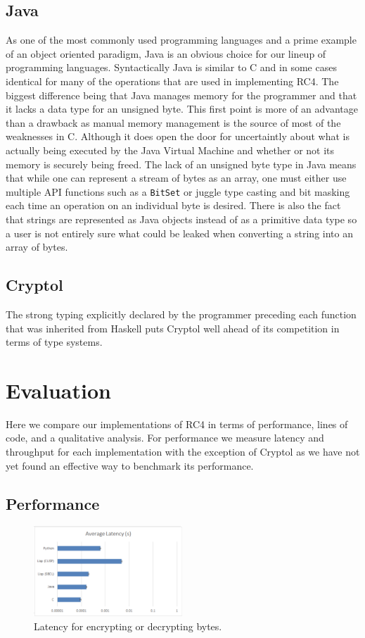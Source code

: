 \subsection{Java}
As one of the most commonly used programming languages and a prime example of an object oriented paradigm, Java is an obvious choice for our lineup of programming languages.
Syntactically Java is similar to C and in some cases identical for many of the operations that are used in implementing RC4. The biggest difference being that Java manages 
memory for the programmer and that it lacks a data type for an unsigned byte. This first point is more of an advantage than a drawback as manual memory management is the 
source of most of the weaknesses in C. Although it does open the door for uncertaintly about what is actually being executed by the Java Virtual Machine and whether or not 
its memory is securely being freed. The lack of an unsigned byte type in Java means that while one can represent a stream of bytes as an array, one must either use multiple 
API functions such as a \texttt{BitSet} or juggle type casting and bit masking each time an operation on an individual byte is desired. There is also the fact that 
strings are represented as Java objects instead of as a primitive data type so a user is not entirely sure what could be leaked when converting a string into an array of 
bytes.

\subsection{Cryptol}
The strong typing explicitly declared by the programmer preceding each function that was inherited from Haskell puts Cryptol well ahead of its competition in terms of 
type systems.

\section{Evaluation}
Here we compare our implementations of RC4 in terms of performance, lines of code, and a qualitative analysis. For performance we measure latency and throughput for 
each implementation with the exception of Cryptol as we have not yet found an effective way to benchmark its performance.

\subsection{Performance}

\begin{figure}
\centerline{ 
\includegraphics[width = 0.5\textwidth]{latency.PNG}}
\caption{Latency for encrypting or decrypting bytes.}
\label{fig:lan}
\end{figure}

